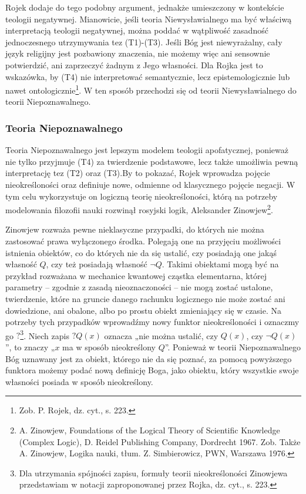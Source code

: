 Rojek dodaje do tego podobny argument, jednakże umieszczony w kontekście
teologii negatywnej. Mianowicie, jeśli teoria Niewysławialnego ma być
właściwą interpretacją teologii negatywnej, można poddać w wątpliwość
zasadność jednoczesnego utrzymywania tez (T1)-(T3). Jeśli Bóg jest
niewyrażalny, cały język religijny jest pozbawiony znaczenia, nie
możemy więc ani sensownie potwierdzić, ani zaprzeczyć żadnym z Jego
własności. Dla Rojka jest to wskazówka, by (T4) nie interpretować
semantycznie, lecz epistemologicznie lub nawet ontologicznie\footnote{
Zob. P. Rojek, dz. cyt., s. 223. }. W ten sposób przechodzi się od
teorii Niewysławialnego do teorii Niepoznawalnego.


\subsubsection{Teoria Niepoznawalnego}

Teoria Niepoznawalnego jest lepszym modelem teologii apofatycznej,
ponieważ nie tylko przyjmuje (T4) za twierdzenie podstawowe, lecz także
umożliwia pewną interpretację tez (T2) oraz (T3).By to pokazać, Rojek
wprowadza pojęcie nieokreśloności oraz definiuje nowe, odmienne od
klasycznego pojęcie negacji. W tym celu wykorzystuje on logiczną teorię
nieokreśloności, którą na potrzeby modelowania filozofii nauki rozwinął
rosyjski logik, Aleksander Zinowjew\footnote{A. Zinowjew, Foundations
of the Logical Theory of Scientific Knowledge (Complex Logic), D.
Reidel Publishing Company, Dordrecht 1967. Zob. Także A. Zinowjew,
Logika nauki, tłum. Z. Simbierowicz, PWN, Warszawa 1976. }.

Zinowjew rozważa pewne nieklasyczne przypadki, do których nie można
zastosować prawa wyłączonego środka. Polegają one na przyjęciu
możliwości istnienia obiektów, co do których nie da się ustalić, czy
posiadają one jakąś własność $Q$, czy też posiadają własność
$\neg Q$. Takimi obiektami mogą być na przykład rozważana
w mechanice kwantowej cząstka elementarna, której parametry -- zgodnie z
zasadą nieoznaczoności -- nie mogą zostać ustalone, twierdzenie, które
na gruncie danego rachunku logicznego nie może zostać ani dowiedzione,
ani obalone, albo po prostu obiekt zmieniający się w czasie. Na
potrzeby tych przypadków wprowadźmy nowy funktor nieokreśloności i
oznaczmy go $?$\footnote{Dla utrzymania spójności zapisu, formuły teorii
nieokreśloności Zinowjewa przedstawiam w notacji zaproponowanej przez
Rojka, dz. cyt., s. 223.  }. Niech zapis $?Q(x)$ oznacza „nie można
ustalić, czy $Q(x)$, czy $\neg Q(x)$”, to znaczy „$x$ ma w sposób
nieokreślony $Q$”. Ponieważ w teorii Niepoznawalnego Bóg uznawany jest za
obiekt, którego nie da się poznać, za pomocą powyższego funktora możemy
podać nową definicję Boga, jako obiektu, który wszystkie swoje
własności posiada w sposób nieokreślony.

